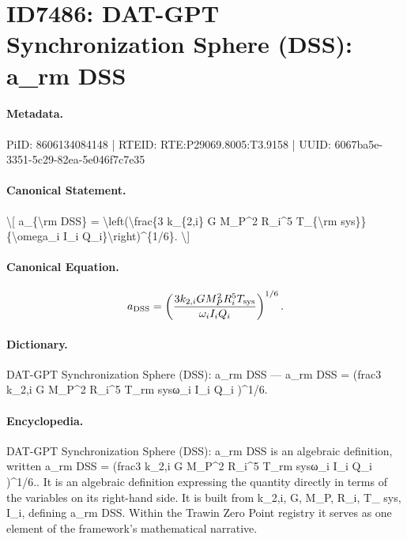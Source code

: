 \section*{ID7486: DAT-GPT Synchronization Sphere (DSS): a\_rm DSS}
\paragraph{Metadata.}
PiID: 8606134084148 | RTEID: RTE:P29069.8005:T3.9158 | UUID: 6067ba5e-3351-5c29-82ea-5e046f7c7e35

\paragraph{Canonical Statement.}
\textbackslash{}[ a\_\{\textbackslash{}rm DSS\} = \textbackslash{}left(\textbackslash{}frac\{3 k\_\{2,i\} G M\_P\textasciicircum{}2 R\_i\textasciicircum{}5 T\_\{\textbackslash{}rm sys\}\}\{\textbackslash{}omega\_i I\_i Q\_i\}\textbackslash{}right)\textasciicircum{}\{1/6\}. \textbackslash{}]

\paragraph{Canonical Equation.}
\[
a_{\rm DSS} = \left(\frac{3 k_{2,i} G M_P^2 R_i^5 T_{\rm sys}}{\omega_i I_i Q_i}\right)^{1/6}.
\]

\paragraph{Dictionary.}
DAT-GPT Synchronization Sphere (DSS): a\_rm DSS — a\_rm DSS = (frac3 k\_2,i G M\_P\textasciicircum{}2 R\_i\textasciicircum{}5 T\_rm sysω\_i I\_i Q\_i )\textasciicircum{}1/6.

\paragraph{Encyclopedia.}
DAT-GPT Synchronization Sphere (DSS): a\_rm DSS is an algebraic definition, written a\_rm DSS = (frac3 k\_2,i G M\_P\textasciicircum{}2 R\_i\textasciicircum{}5 T\_rm sysω\_i I\_i Q\_i )\textasciicircum{}1/6.. It is an algebraic definition expressing the quantity directly in terms of the variables on its right-hand side. It is built from k\_2,i, G, M\_P, R\_i, T\_ sys, I\_i, defining a\_rm DSS. Within the Trawin Zero Point registry it serves as one element of the framework's mathematical narrative.
